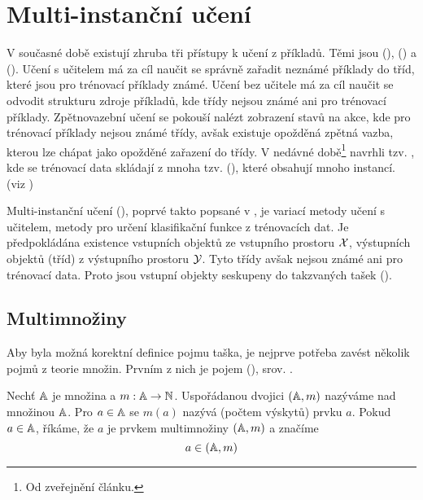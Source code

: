 \chapter{Multi-instanční učení}\label{MIL}

V současné době existují zhruba tři přístupy k učení z příkladů. Těmi jsou  (),  () a  (). Učení s učitelem má za cíl naučit se správně zařadit neznámé příklady do tříd, které jsou pro trénovací příklady známé. Učení bez učitele má za cíl naučit se odvodit strukturu zdroje příkladů, kde třídy nejsou známé ani pro trénovací příklady. Zpětnovazební učení se pokouší nalézt zobrazení stavů na akce, kde pro trénovací příklady nejsou známé třídy, avšak existuje opožděná zpětná vazba, kterou lze chápat jako opožděné zařazení do třídy. V nedávné době\footnote{Od zveřejnění článku.} \cite{dietterich_solving_1997} navrhli tzv. , kde se trénovací data skládají z mnoha tzv.  (), které obsahují mnoho instancí. (viz \cite{zhou_neural_2002})

Multi-instanční učení (), poprvé takto popsané v \cite{dietterich_solving_1997}, je variací metody učení s učitelem, metody pro určení klasifikační funkce z trénovacích dat. Je předpokládána existence vstupních objektů ze vstupního prostoru \( \mathcal X \), výstupních objektů (tříd) z výstupního prostoru \( \mathcal Y \). Tyto třídy avšak nejsou známé ani pro trénovací data. Proto jsou vstupní objekty seskupeny do takzvaných tašek ().

\section{Multimnožiny}
Aby byla možná korektní definice pojmu taška, je nejprve potřeba zavést několik pojmů z teorie množin. Prvním z nich je pojem  (), srov. \cite{knuth_art_1968}.

\begin{define}
	Nechť \( \mathbb A \) je množina a \( m : \mathbb A \to \mathbb N \).
	Uspořádanou dvojici \( \left( \mathbb A, m \right) \) nazýváme  nad množinou \( \mathbb A \). Pro \( a \in \mathbb A \) se \( m \left( a \right) \) nazývá  (počtem výskytů) prvku \( a \). Pokud \( a \in \mathbb A \), říkáme, že \( a \) je prvkem multimnožiny \( \left( \mathbb A, m \right) \) a značíme 
	\[ a \in \left( \mathbb A, m \right) \]
\end{define}

